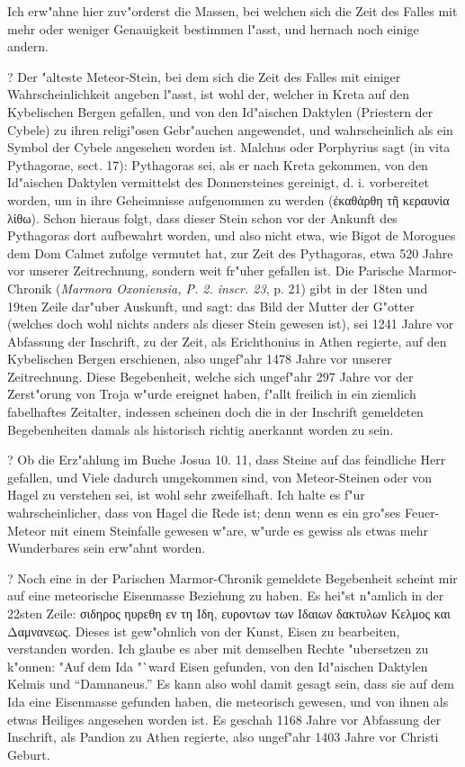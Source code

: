 \documentclass[a4paper, 11pt, oneside, polutonikogreek, german]{article}
\begin{document}
Ich erw"ahne hier zuv"orderst die Massen, bei welchen sich die Zeit des Falles mit mehr oder weniger Genauigkeit bestimmen l"asst, und hernach noch einige andern.

? Der "alteste Meteor-Stein, bei dem sich die Zeit des Falles mit einiger Wahrscheinlichkeit angeben l"asst, ist wohl der, welcher in Kreta auf den Kybelischen Bergen gefallen, und von den Id"aischen Daktylen (Priestern der Cybele) zu ihren religi"osen Gebr"auchen angewendet, und wahrscheinlich als ein Symbol der Cybele angesehen worden ist. Malchus oder Porphyrius sagt (in vita Pythagorae, sect. 17): Pythagoras sei, als er nach Kreta gekommen, von den Id"aischen Daktylen vermittelst des Donnersteines gereinigt, d. i. vorbereitet worden, um in ihre Geheimnisse aufgenommen zu werden (ἐκαθἁρθη τῆ κεραυνἱα λἱθω). Schon hieraus folgt, dass dieser Stein schon vor der Ankunft des Pythagoras dort aufbewahrt worden, und also nicht etwa, wie Bigot de Morogues dem Dom Calmet zufolge vermutet hat, zur Zeit des Pythagoras, etwa 520 Jahre vor unserer Zeitrechnung, sondern weit fr"uher gefallen ist. Die Parische Marmor-Chronik (\emph{Marmora Oxoniensia, P. 2. inscr. 23}, p. 21) gibt in der 18ten und 19ten Zeile dar"uber Auskunft, und sagt: das Bild der Mutter der G"otter (welches doch wohl nichts anders als dieser Stein gewesen ist), sei 1241 Jahre vor Abfassung der Inschrift, zu der Zeit, als Erichthonius in Athen regierte, auf den Kybelischen Bergen erschienen, also ungef"ahr 1478 Jahre vor unserer Zeitrechnung. Diese Begebenheit, welche sich ungef"ahr 297 Jahre vor der Zerst"orung von Troja w"urde ereignet haben, f"allt freilich in ein ziemlich fabelhaftes Zeitalter, indessen scheinen doch die in der Inschrift gemeldeten Begebenheiten damals als historisch richtig anerkannt worden zu sein.

? Ob die Erz"ahlung im Buche Josua 10. 11, dass Steine auf das feindliche Herr gefallen, und Viele dadurch umgekommen sind, von Meteor-Steinen oder von Hagel zu verstehen sei, ist wohl sehr zweifelhaft. Ich halte es f"ur wahrscheinlicher, dass von Hagel die Rede ist; denn wenn es ein gro"ses Feuer-Meteor mit einem Steinfalle gewesen w"are, w"urde es gewiss als etwas mehr Wunderbares sein erw"ahnt worden.

? Noch eine in der Parischen Marmor-Chronik gemeldete Begebenheit scheint mir auf eine meteorische Eisenmasse Beziehung zu haben. Es hei"st n"amlich in der 22sten Zeile: σιδηρος ηυρεθη εν τη Iδη, ευροντων των Iδαιων δακτυλων Kελμος και Δαμνανεως. Dieses ist gew"ohnlich von der Kunst, Eisen zu bearbeiten, verstanden worden. Ich glaube es aber mit demselben Rechte "ubersetzen zu k"onnen: "Auf dem Ida "`ward Eisen gefunden, von den Id"aischen Daktylen Kelmis und "`Damnaneus."' Es kann also wohl damit gesagt sein, dass sie auf dem Ida eine Eisenmasse gefunden haben, die meteorisch gewesen, und von ihnen als etwas Heiliges angesehen worden ist. Es geschah 1168 Jahre vor Abfassung der Inschrift, als Pandion zu Athen regierte, also ungef"ahr 1403 Jahre vor Christi Geburt.
\end{document}
